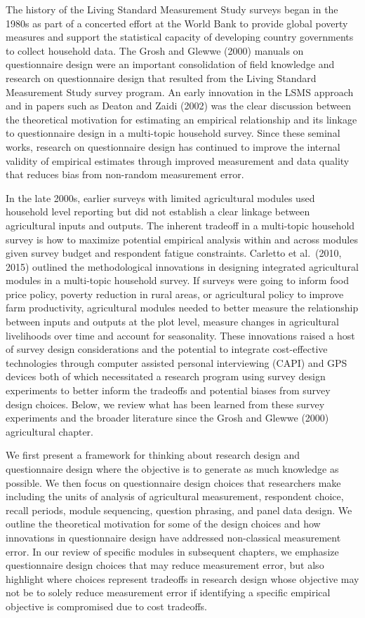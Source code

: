 \documentclass[
]{book}
\begin{document}
The history of the Living Standard Measurement Study surveys began in the 1980s as part of a concerted effort at the World Bank to provide global poverty measures and support the statistical capacity of developing country governments to collect household data. The Grosh and Glewwe (2000) manuals on questionnaire design were an important consolidation of field knowledge and research on questionnaire design that resulted from the Living Standard Measurement Study survey program. An early innovation in the LSMS approach and in papers such as Deaton and Zaidi (2002) was the clear discussion between the theoretical motivation for estimating an empirical relationship and its linkage to questionnaire design in a multi-topic household survey. Since these seminal works, research on questionnaire design has continued to improve the internal validity of empirical estimates through improved measurement and data quality that reduces bias from non-random measurement error.

In the late 2000s, earlier surveys with limited agricultural modules used household level reporting but did not establish a clear linkage between agricultural inputs and outputs. The inherent tradeoff in a multi-topic household survey is how to maximize potential empirical analysis within and across modules given survey budget and respondent fatigue constraints. Carletto et al.~(2010, 2015) outlined the methodological innovations in designing integrated agricultural modules in a multi-topic household survey. If surveys were going to inform food price policy, poverty reduction in rural areas, or agricultural policy to improve farm productivity, agricultural modules needed to better measure the relationship between inputs and outputs at the plot level, measure changes in agricultural livelihoods over time and account for seasonality. These innovations raised a host of survey design considerations and the potential to integrate cost-effective technologies through computer assisted personal interviewing (CAPI) and GPS devices both of which necessitated a research program using survey design experiments to better inform the tradeoffs and potential biases from survey design choices. Below, we review what has been learned from these survey experiments and the broader literature since the Grosh and Glewwe (2000) agricultural chapter.

We first present a framework for thinking about research design and questionnaire design where the objective is to generate as much knowledge as possible. We then focus on questionnaire design choices that researchers make including the units of analysis of agricultural measurement, respondent choice, recall periods, module sequencing, question phrasing, and panel data design. We outline the theoretical motivation for some of the design choices and how innovations in questionnaire design have addressed non-classical measurement error. In our review of specific modules in subsequent chapters, we emphasize questionnaire design choices that may reduce measurement error, but also highlight where choices represent tradeoffs in research design whose objective may not be to solely reduce measurement error if identifying a specific empirical objective is compromised due to cost tradeoffs.
\end{document}
